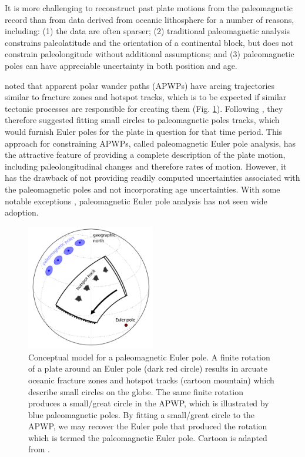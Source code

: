 \documentclass[11pt,letterpaper]{article}
\begin{document}
It is more challenging to reconstruct past plate motions from the paleomagnetic record than from data derived from oceanic lithosphere for a number of reasons, including: (1) the data are often sparser; (2) traditional paleomagnetic analysis constrains paleolatitude and the orientation of a continental block, but does not constrain paleolongitude without additional assumptions; and (3) paleomagnetic poles can have appreciable uncertainty in both position and age.

\cite{Gordon1984a} noted that apparent polar wander paths (APWPs) have arcing trajectories similar to fracture zones and hotspot tracks, which is to be expected if similar tectonic processes are responsible for creating them (Fig. \ref{fig:pep}). Following \cite{Francheteau1969a}, they therefore suggested fitting small circles to paleomagnetic poles tracks, which would furnish Euler poles for the plate in question for that time period. This approach for constraining APWPs, called paleomagnetic Euler pole analysis, has the attractive feature of providing a complete description of the plate motion, including paleolongitudinal changes and therefore rates of motion. However, it has the drawback of not providing readily computed uncertainties associated with the paleomagnetic poles and not incorporating age uncertainties. With some notable exceptions \citep[e.g.][]{Bryan1986a, Beck1989a, Tarling1996a, Beck2003a, Smirnov2010a}, paleomagnetic Euler pole analysis has not seen wide adoption.

\begin{figure}
\includegraphics[width=0.5\textwidth]{fig_PEP_annotated.png}
\caption{Conceptual model for a paleomagnetic Euler pole. A finite rotation of a plate around an Euler pole (dark red circle) results in arcuate oceanic fracture zones and hotspot tracks (cartoon mountain) which describe small circles on the globe. The same finite rotation produces a small/great circle in the APWP, which is illustrated by blue paleomagnetic poles. By fitting a small/great circle to the APWP, we may recover the Euler pole that produced the rotation which is termed the paleomagnetic Euler pole. Cartoon is adapted from \cite{Gordon1984a}.}
\label{fig:pep}
\end{figure}
\end{document}
